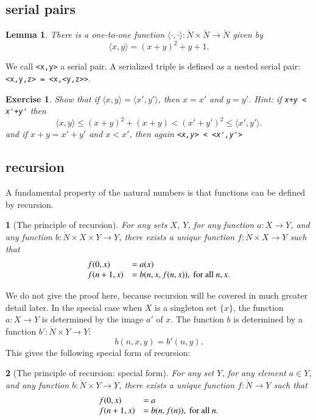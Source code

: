 \documentclass[cup9a]{cupbook}
\newtheorem{assert}{}[chapter]
\newtheorem{exer}{Exercise}[chapter]
\newtheorem{lemma}{Lemma}[chapter]
\begin{document}
\subsection{serial pairs}

\begin{lemma}
There is a one-to-one function $\langle\cdot,\cdot\rangle:\ring{N}\times\ring{N}\to\ring{N}$ given by
$$
\langle x,y\rangle = (x+y)^2 + y + 1.
$$
\end{lemma}
We call \verb!<x,y>! a serial pair. A serialized triple is defined as a nested serial pair: \verb!<x,y,z> = <x,<y,z>>!.

\begin{exer} Show that if $\langle x,y\rangle = \langle x',y'\rangle$, then $x=x'$ and $y=y'$.
Hint: if \verb!x+y < x'+y'! then 
$$
\langle x,y\rangle\le (x+y)^2+(x+y) < (x'+y')^2 \le \langle x',y'\rangle.
$$
and if $x+y=x'+y'$ and $x<x'$, then again \verb!<x,y> < <x',y'>!
\end{exer}



\subsection{recursion}

A fundamental property of the natural numbers is that functions can be
defined by recursion.


\begin{assert}[The principle of recursion]  For any sets $X$, $Y$, for any function $a:X\to Y$, and any function $b:\ring{N}\times X\times Y\to Y$, there exists a unique function $f:\ring{N}\times X\to Y$ such that
$$
\begin{array}{lll}
f(0,x) &= a(x)\\
f(n+1,x) &= b(n,x,f(n,x)),\hbox{ for all } n, x.
\end{array}
$$
\end{assert}

We do not give the proof here, because recursion will be covered in much greater detail later.  In the special case when $X$ is a singleton set $\{x\}$, the function $a:X\to Y$ is determined by the image $a'$ of $x$.  The function $b$ is determined by a function $b':\ring{N}\times Y\to Y$:
$$
b(n,x,y) = b'(n,y).
$$
This gives the following special form of recursion:

\begin{assert}[The principle of recursion: special form]  For any set $Y$, for any element $a\in Y$, and any function $b:\ring{N}\times Y\to Y$, there exists a unique function $f:\ring{N}\to Y$ such that
$$
\begin{array}{lll}
f(0,x) &= a\\
f(n+1,x) &= b(n,f(n)),\hbox{ for all } n.
\end{array}
$$
\end{assert}
\end{document}

